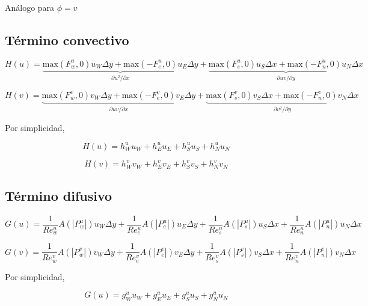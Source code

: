 Análogo para $\phi=v$

\subsection{Término convectivo}

\begin{equation}
H(u) = \underbrace{\mbox{max}(F_w^u,0) u_W \Delta y + \mbox{max}(-F_e^u,0) u_E \Delta y}_{\partial u^2 / \partial x} +  \underbrace{\mbox{max}(F_s^u,0) u_S \Delta x + \mbox{max}(-F_n^u,0) u_N \Delta x}_{\partial uv / \partial y}
\end{equation}

\begin{equation}
H(v) =  \underbrace{\mbox{max}(F_w^v,0) v_W \Delta y + \mbox{max}(-F_e^v,0) v_E \Delta y}_{\partial uv / \partial x} +  \underbrace{\mbox{max}(F_s^v,0) v_S \Delta x + \mbox{max}(-F_n^v,0) v_N \Delta x}_{\partial v^2 / \partial y} 
\end{equation}

Por simplicidad,

\begin{equation}
H(u) = h_W^u u_W + h_E^u u_E + h_S^u u_S + h_N^u u_N
\end{equation}

\begin{equation}
H(v) = h_W^v v_W + h_E^v v_E + h_S^v v_S + h_N^v v_N
\end{equation}

\subsection{Término difusivo}

\begin{equation}
G(u) = \dfrac{1}{Re_w^u} A(|P_w^u|) u_W \Delta y + \dfrac{1}{Re_e^u} A(|P_e^u|) u_E \Delta y + \dfrac{1}{Re_s^u} A(|P_s^u|) u_S \Delta x + \dfrac{1}{Re_n^u} A(|P_n^u|) u_N \Delta x 
\end{equation}

\begin{equation}
G(v) =  \dfrac{1}{Re_w^v} A(|P_w^v|) v_W \Delta y + \dfrac{1}{Re_e^v} A(|P_e^v|) v_E \Delta y + \dfrac{1}{Re_s^v} A(|P_s^v|) v_S \Delta x + \dfrac{1}{Re_n^v} A(|P_n^v|) v_N \Delta x 
\end{equation}

Por simplicidad,

\begin{equation}
G(u) = g_W^u u_W + g_E^u u_E + g_S^u u_S + g_N^u u_N
\end{equation}

